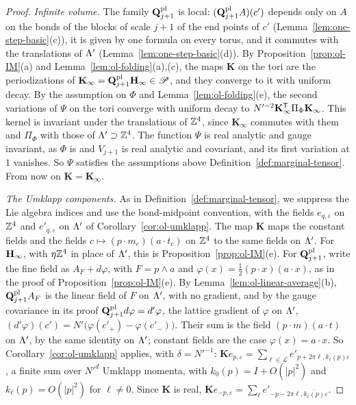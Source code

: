 \begin{proof}
\emph{Infinite volume.} The family $\mathbf Q^{\rm pl}_{j+1}$ is local: $(\mathbf Q^{\rm pl}_{j+1}A)(c')$ depends only on $A$ on the bonds of the blocks of scale $j+1$ of the end points of $c'$ (Lemma~\ref{lem:one-step-basic}(c)), it is given by one formula on every torus, and it commutes with the translations of $\Lambda'$ (Lemma~\ref{lem:one-step-basic}(d)). By Proposition~\ref{prop:ol-IM}(a) and Lemma~\ref{lem:ol-folding}(a),(c), the maps $\mathbf K$ on the tori are the periodizations of $\mathbf K_\infty=\mathbf Q^{\rm pl}_{j+1}\mathbf H_\infty\in\mathscr P$, and they converge to it with uniform decay. By the assumption on $\Phi$ and Lemma~\ref{lem:ol-folding}(e), the second variations of $\Psi$ on the tori converge with uniform decay to $N'^{-2}\mathbf K_\infty^{\sf T}\Pi_\Phi\mathbf K_\infty$. This kernel is invariant under the translations of $\mathbb Z^4$, since $\mathbf K_\infty$ commutes with them and $\Pi_\Phi$ with those of $\Lambda'\supset\mathbb Z^4$. The function $\Psi$ is real analytic and gauge invariant, as $\Phi$ is and $V_{j+1}$ is real analytic and covariant, and its first variation at $1$ vanishes. So $\Psi$ satisfies the assumptions above Definition~\ref{def:marginal-tensor}. From now on $\mathbf K=\mathbf K_\infty$.

\emph{The Umklapp components.} As in Definition~\ref{def:marginal-tensor}, we suppress the Lie algebra indices and use the bond-midpoint convention, with the fields $e_{q,\varepsilon}$ on $\mathbb Z^4$ and $e'_{q,\varepsilon}$ on $\Lambda'$ of Corollary~\ref{cor:ol-umklapp}. The map $\mathbf K$ maps the constant fields and the fields $c\mapsto(p\cdot m_c)(a\cdot t_c)$ on $\mathbb Z^4$ to the same fields on $\Lambda'$. For $\mathbf H_\infty$, with $\eta\mathbb Z^4$ in place of $\Lambda'$, this is Proposition~\ref{prop:ol-IM}(e). For $\mathbf Q^{\rm pl}_{j+1}$, write the fine field as $A_F+d\varphi$, with $F=p\wedge a$ and $\varphi(x)=\frac12(p\cdot x)(a\cdot x)$, as in the proof of Proposition~\ref{prop:ol-IM}(e). By Lemma~\ref{lem:ol-linear-average}(b), $\mathbf Q^{\rm pl}_{j+1}A_F$ is the linear field of $F$ on $\Lambda'$, with no gradient, and by the gauge covariance in its proof $\mathbf Q^{\rm pl}_{j+1}d\varphi=d'\varphi$, the lattice gradient of $\varphi$ on $\Lambda'$, $(d'\varphi)(c')=N'\big(\varphi(c'_+)-\varphi(c'_-)\big)$. Their sum is the field $(p\cdot m)(a\cdot t)$ on $\Lambda'$, by the same identity on $\Lambda'$; constant fields are the case $\varphi(x)=a\cdot x$. So Corollary~\ref{cor:ol-umklapp} applies, with $\delta=N'^{-1}$: $\mathbf Ke_{p,\varepsilon}=\sum_{\ell\in\mathcal L}e'_{p+2\pi\ell,k_\ell(p)\varepsilon}$, a finite sum over $N'^d$ Umklapp momenta, with $k_0(p)=I+O(|p|^2)$ and $k_\ell(p)=O(|p|^2)$ for $\ell\ne0$. Since $\mathbf K$ is real, $\mathbf Ke_{-p,\varepsilon}=\sum_\ell e'_{-p-2\pi\ell,\overline{k_\ell(p)}\varepsilon}$.


\end{proof}
